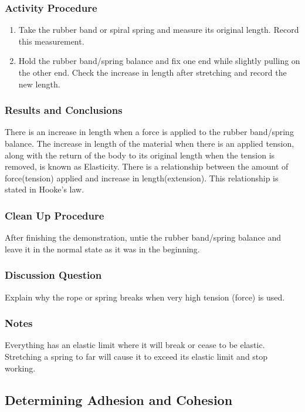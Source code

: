 \subsubsection*{Activity Procedure}
\begin{enumerate}
\item{Take the rubber band or spiral spring and measure its original length. Record this measurement.} 
\item{Hold the rubber band/spring balance and fix one end while slightly pulling on the other end. Check the increase in length after stretching and record the new length.} 
\end{enumerate}

\subsubsection*{Results and Conclusions}
There is an increase in length when a force is applied to the rubber band/spring balance. 
The increase in length of the material when there is an applied tension, along with the return of the body to its original length when the tension is removed, is known as Elasticity. 
There is a relationship between the amount of force(tension) applied and increase in length(extension). This relationship is stated in Hooke's law. 

\subsubsection*{Clean Up Procedure}
After finishing the demonstration, untie the rubber band/spring balance and leave it in the normal state as it was in the beginning.

\subsubsection*{Discussion Question}
Explain why the rope or spring breaks when very high tension (force) is used.

\subsubsection*{Notes}
Everything has an elastic limit where it will break or cease to be elastic. Stretching a spring to far will cause it to exceed its elastic limit and stop working.

\subsection{Determining Adhesion and Cohesion}

